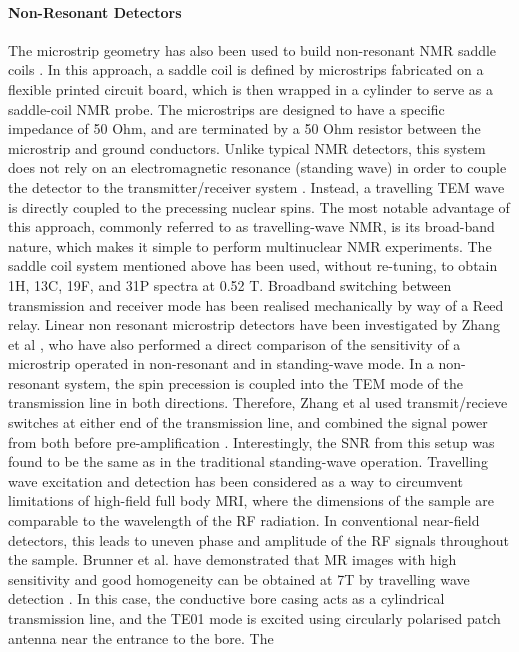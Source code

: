 \paragraph{Non-Resonant Detectors}
The microstrip geometry
has also been used to build non-resonant NMR saddle coils
\cite{Murphree:2007hg}. In this approach, a saddle coil is defined by
microstrips fabricated on a flexible printed circuit board, which is
then wrapped in a cylinder to serve as a saddle-coil NMR probe. The
microstrips are designed to have a specific impedance of 50 Ohm, and are
terminated by a 50 Ohm resistor between the microstrip and ground
conductors. Unlike typical NMR detectors, this system does not rely on
an electromagnetic resonance (standing wave) in order to couple the
detector to the transmitter/receiver system \cite{REF:Mispelter}. Instead,
a travelling TEM wave is directly coupled to the precessing nuclear
spins. The most notable advantage of this approach, commonly referred to
as travelling-wave NMR, is its broad-band nature, which makes it simple
to perform multinuclear NMR experiments. The saddle coil system
mentioned above has been used, without re-tuning, to obtain 1H, 13C,
19F, and 31P spectra at 0.52 T. Broadband switching between transmission
and receiver mode has been realised mechanically by way of a Reed relay.
Linear non resonant microstrip detectors have been investigated by Zhang
et al \cite{Zhang:2008uh}, who have also performed a direct comparison of
the sensitivity of a microstrip operated in non-resonant and in
standing-wave mode. In a non-resonant system, the spin precession is
coupled into the TEM mode of the transmission line in both directions.
Therefore, Zhang et al used transmit/recieve switches at either end of
the transmission line, and combined the signal power from both before
pre-amplification \cite{Zhang:2009tu}. Interestingly, the SNR from this
setup was found to be the same as in the traditional standing-wave
operation. Travelling wave excitation and detection has been considered
as a way to circumvent limitations of high-field full body MRI, where
the dimensions of the sample are comparable to the wavelength of the RF
radiation. In conventional near-field detectors, this leads to uneven
phase and amplitude of the RF signals throughout the sample. Brunner et
al. have demonstrated that MR images with high sensitivity and good
homogeneity can be obtained at 7T by travelling wave detection
\cite{Brunner:2009ff}. In this case, the conductive bore casing acts as a
cylindrical transmission line, and the TE01 mode is excited using
circularly polarised patch antenna near the entrance to the bore. The
